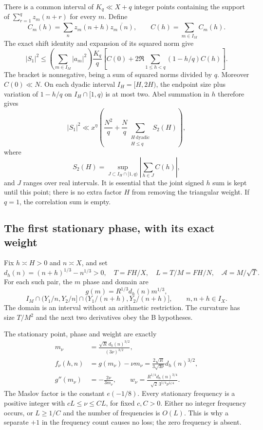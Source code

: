 \documentclass[11pt,a4paper]{article}
\numberwithin{equation}{section}
\theoremstyle{remark}
\begin{document}
There is a common interval of $K_q\ll X+q$ integer points containing the
support of $\sum_{r=1}^q z_m(n+r)$ for every $m$. Define
\[
 C_m(h)=\sum_n z_m(n+h)\overline{z_m(n)},\qquad
 C(h)=\sum_{m\in I_M}C_m(h).
\]
The exact shift identity and expansion of its squared norm give
\begin{equation}\label{eq:signed-A}
 |S_1|^2\le
 \left(\sum_{m\in I_M}|a_m|^2\right)\frac{K_q}{q}
 \left[C(0)+2\Re\sum_{1\le h<q}(1-h/q)C(h)\right].
\end{equation}
The bracket is nonnegative, being a sum of squared norms divided by $q$.
Moreover $C(0)\ll N$. On each dyadic interval $I_H=[H,2H)$, the endpoint
size plus variation of $1-h/q$ on $I_H\cap[1,q)$ is at most two. Abel
summation in $h$ therefore gives
\begin{equation}\label{eq:A0}
 |S_1|^2\ll x^\eta\left(\frac{N^2}{q}
             +\frac Nq\sum_{\substack{H\ \mathrm{dyadic}\\H\le q}}S_2(H)\right),
\end{equation}
where
\[
 S_2(H)=\sup_{J\subset I_H\cap[1,q)}
            \left|\sum_{h\in J}C(h)\right|,
\]
and $J$ ranges over real intervals. It is essential that the joint signed
$h$ sum is kept until this point; there is no extra factor $H$ from
removing the triangular weight. If $q=1$, the correlation sum is empty.

\subsection{The first stationary phase, with its exact weight}
Fix $h\asymp H>0$ and $n\asymp X$, and set
\begin{equation}\label{eq:T-L}
 d_h(n)=(n+h)^{1/3}-n^{1/3}>0,
 \quad T=FH/X,\quad L=T/M=FH/N,\quad \mathcal A=M/\sqrt T.
\end{equation}
For each such pair, the $m$ phase and domain are
\[
 g(m)=R^{1/3}d_h(n)m^{1/3},
\]
\[
 I_M\cap(Y_1/n,Y_2/n]\cap(Y_1/(n+h),Y_2/(n+h)],
 \qquad n,n+h\in I_X.
\]
The domain is an interval without an arithmetic restriction. The curvature
has size $T/M^2$ and the next two derivatives obey the B hypotheses.

The stationary point, phase and weight are exactly
\begin{align}
 m_\nu&=\frac{\sqrt R\,d_h(n)^{3/2}}{(3\nu)^{3/2}},
       \label{eq:mnu}\\
 f_\nu(h,n)&=g(m_\nu)-\nu m_\nu
     =\frac{2\sqrt R}{3\sqrt{3\nu}}d_h(n)^{3/2},
       \label{eq:fnu}\\
 g''(m_\nu)&=-\frac{2\nu}{3m_\nu},\qquad
 w_\nu=\frac{R^{1/4}d_h(n)^{3/4}}
                  {\sqrt2\,3^{1/4}\nu^{5/4}}.
       \label{eq:wnu}
\end{align}
The Maslov factor is the constant $e(-1/8)$. Every stationary frequency
is a positive integer with $cL\le\nu\le CL$, for fixed $c,C>0$.
Either no integer frequency occurs, or $L\ge1/C$ and the number of
frequencies is $O(L)$. This is why a separate $+1$ in the frequency count
causes no loss; the zero frequency is absent.
\end{document}

